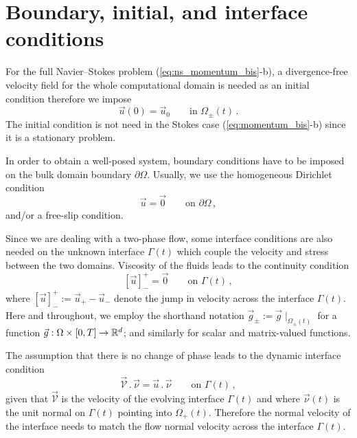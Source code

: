 \section[Boundary, initial, and interface conditions]{Boundary, initial, and
interface conditions}
For the full Navier--Stokes problem (\ref{eq:ns_momentum_bis}-b), a
divergence-free velocity field for the whole computational domain is needed as
an initial condition therefore we impose
\begin{equation}\label{eq:ns_ic}
\vec u(0) = \vec u_0 \qquad \mbox{in } \Omega_\pm(t)\,.
\end{equation}
The initial condition is not need in the Stokes case (\ref{eq:momentum_bis}-b)
since it is a stationary problem.

In order to obtain a well-posed system, boundary conditions have to be imposed
on the bulk domain boundary $\partial\Omega$. Usually, we use the homogeneous
Dirichlet condition
\begin{equation}\label{eq:ns_bc}
\vec u = \vec 0 \qquad \mbox{on } \partial \Omega\,,
\end{equation}
and/or a free-slip condition.

Since we are dealing with a two-phase flow, some interface conditions are also
needed on the unknown interface $\Gamma(t)$ which couple the velocity and
stress between the two domains. Viscosity of the fluids leads to the continuity
condition
\begin{equation}\label{eq:interface_jump_velocity}
[\vec u]_-^+ = \vec 0 \qquad \mbox{on } \Gamma(t)\,,
\end{equation}
where $[\vec u]_-^+ := \vec u_+ - \vec u_-$ denote the jump in velocity across
the interface $\Gamma(t)$. Here and throughout, we employ the shorthand notation
$\vec g_\pm := \vec g\!\mid_{\Omega_\pm(t)}$ for a function
$\vec g : \Omega \times [0,T] \to {\mathbb R}^d$; and similarly for scalar and
matrix-valued functions.

The assumption that there is no change of phase leads to the dynamic interface
condition
\begin{equation} \label{eq:interface_velocity}
\vec{\mathcal{V}}\,.\,\vec\nu = \vec u\,.\,\vec \nu \qquad \mbox{on }
\Gamma(t)\,,
\end{equation}
given that $\vec{\mathcal{V}}$ is the velocity of the evolving interface
$\Gamma(t)$ and where $\vec\nu(t)$ is the unit normal on $\Gamma(t)$ pointing
into $\Omega_+(t)$. Therefore the normal velocity of the interface needs to
match the flow normal velocity across the interface $\Gamma(t)$.

